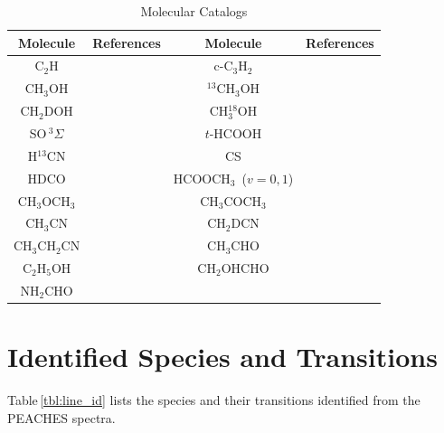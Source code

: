 \documentclass[twocolumn]{aastex62}
\newcommand{\htcn}{\mbox{H$^{13}$CN}}
\newcommand{\methylformate}{\mbox{HCOOCH$_{3}$}}
\newcommand{\methanol}{\mbox{CH$_{3}$OH}}
\newcommand{\tmethanol}{\mbox{$^{13}$CH$_{3}$OH}}
\newcommand{\dmethanol}{\mbox{CH$_{2}$DOH}}
\newcommand{\dimethylether}{\mbox{CH$_{3}$OCH$_{3}$}}
\newcommand{\acetone}{\mbox{CH$_{3}$COCH$_{3}$}}
\newcommand{\ethanol}{\mbox{C$_{2}$H$_{5}$OH}}
\newcommand{\acetaldehyde}{\mbox{CH$_{3}$CHO}}
\newcommand{\ethylcyanide}{\mbox{CH$_{3}$CH$_{2}$CN}}
\newcommand{\methylcyanide}{\mbox{CH$_{3}$CN}}
\newcommand{\sosigma}{\mbox{SO\,$^{3}\Sigma$}}
\newcommand{\glycolaldehyde}{\mbox{CH$_{2}$OHCHO}}
\newcommand{\formamide}{\mbox{NH$_{2}$CHO}}
\newcommand{\cch}{\mbox{C$_2$H}}
\begin{document}
\begin{table}
  \caption{Molecular Catalogs}
  \label{tbl:molcat}
  \centering
  \begin{tabular}{cp{2in}cp{2in}}
  Molecule & References & Molecule & References \\
  \toprule
  \cch & \citet{1981ApJ...251L.119S,2000AA...357L..65M} &
  c-C$_3$H$_2$ & \citet{1986CPL...125..383B,1987ApJ...314..716V} \\
  \methanol & \citet{2008JMoSp.251..305X} &
  \tmethanol & \citet{1984ApJS...55..633P,1999ApJ...521..255O,2007JMoSp.246..158C,2008JMoSp.251..293M,2009JMoSp.255...32I} \\
  \dmethanol & \citet{2012JMoSp.280..119P} &
  CH$_3^{18}$OH & \citet{2007JMoSp.245....7F} \\
  \sosigma & \citet{1964JChPh..41.1413P,1974JMoSp..53..346A,1976JMoSp..60..332C,1992ApJ...399..325L,1994JMoSp.167..468C} &
  $t$-HCOOH & \citet{1957JChPh..26..680L,1958JChPh..28..736T,1962JChPh..37.2748K,1971JMoSt...9...49B,1982JMoSp..93..248K} \\
  \htcn & \citet{2000JMoSp.202..166M,2004ZNatA..59..861F,2005JMoSp.233..280C} &
  CS & \citet{2005JMoSt.742..215M} \\
  HDCO & \citet{1999JMoSp.195..345B} &
  \methylformate\ ($v=0, 1$) & \citet{2009JMoSp.255...32I} \\
  \dimethylether & \citet{2009AA...504..635E} &
  \acetone & \citet{2002ApJS..142..145G} \\
  \methylcyanide & \citet{2006JMoSp.240..153C,2009AA...506.1487M} &
  CH$_2$DCN & \citet{2013AA...553A..84N} \\
  \ethylcyanide & \citet{1994ApJS...93..589P,2009ApJS..184..133B} &
  \acetaldehyde & \citet{1996JPCRD..25.1113K} \\
  \ethanol & \citet{1996JMoSp.175..246P,2008JMoSp.251..394P} &
  \glycolaldehyde & \citet{2001ApJS..134..319B} \\
  \formamide & \cite{blanco2006microsolvation,2009JMoSp.254...28K} & & \\

  \bottomrule
  \end{tabular}
\end{table}

\newpage
\section{Identified Species and Transitions}
Table\,\ref{tbl:line_id} lists the species and their transitions identified from the PEACHES spectra.
\newpage

\end{document}
